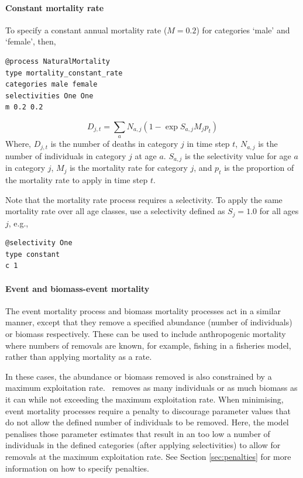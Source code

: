 \paragraph{Constant mortality rate}

To specify a constant annual mortality rate ($M=0.2$) for categories `male' and `female', then, 
{\small{\begin{verbatim}
@process NaturalMortality
type mortality_constant_rate
categories male female
selectivities One One
m 0.2 0.2
\end{verbatim}}}

\begin{equation}
D_{j,t} = \sum_a N_{a,j} (1 - \exp{S_{a,j} M_j p_t})
\end{equation}
Where, $D_{j,t}$ is the number of deaths in category $j$ in time step $t$, $N_{a,j}$ is the number of individuals in category $j$ at age $a$. $S_{a,j}$ is the selectivity value for age $a$ in category $j$, $M_j$ is the mortality rate for category $j$, and $p_t$ is the proportion of the mortality rate to apply in time step $t$.

Note that the mortality rate process requires a selectivity. To apply the same mortality rate over all age classes, use a selectivity defined as $S_j=1.0$ for all ages $j$, e.g.,

{\small{\begin{verbatim}
@selectivity One
type constant
c 1
\end{verbatim}}}

\paragraph{Event and biomass-event mortality}

The event mortality process and biomass mortality processes act in a similar manner, except that they remove a specified abundance (number of individuals) or biomass respectively. These can be used to include anthropogenic mortality where numbers of removals are known, for example, fishing in a fisheries model, rather than applying mortality as a rate. 

In these cases, the abundance or biomass removed is also constrained by a maximum exploitation rate. \CNAME\ removes as many individuals or as much biomass as it can while not exceeding the maximum exploitation rate. When minimising, event mortality processes require a penalty to discourage parameter values that do not allow the defined number of individuals to be removed. Here, the model penalises those parameter estimates that result in an too low a number of individuals in the defined categories (after applying selectivities) to allow for removals at the maximum exploitation rate. See Section \ref{sec:penalties} for more information on how to specify penalties.

